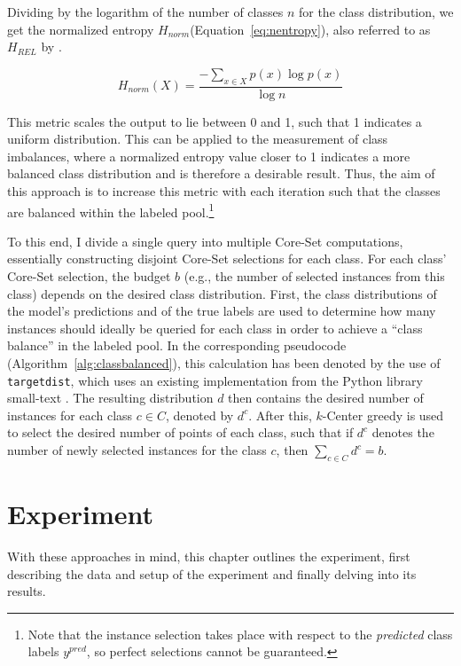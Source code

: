 \documentclass[english,bachelor,ul]{webisthesis} %
\begin{document}
\noindent Dividing by the logarithm of the number of classes $n$ for the class distribution, we get the normalized entropy $ H_{norm} $(Equation~\ref{eq:nentropy}), also referred to as $ H_{REL} $ by \cite{wilcox1967indices}.

\begin{equation}\label{eq:nentropy}
    H_{norm}(X) = \frac{-\sum_{x \in X} p(x) \log p(x)}{\log n}
\end{equation}

\noindent This metric scales the output to lie between 0 and 1, such that 1 indicates a uniform distribution. This can be applied to the measurement of class imbalances, where a normalized entropy value closer to 1 indicates a more balanced class distribution and is therefore a desirable result. Thus, the aim of this approach is to increase this metric with each iteration such that the classes are balanced within the labeled pool.\footnote{Note that the instance selection takes place with respect to the \textit{predicted} class labels $ y^{pred} $, so perfect selections cannot be guaranteed.}

To this end, I divide a single query into multiple Core-Set computations, essentially constructing disjoint Core-Set selections for each class. For each class' Core-Set selection, the budget $ b $ (e.g., the number of selected instances from this class) depends on the desired class distribution. First, the class distributions of the model's predictions and of the true labels are used to determine how many instances should ideally be queried for each class in order to achieve a ``class balance'' in the labeled pool. In the corresponding pseudocode (Algorithm~\ref{alg:classbalanced}), this calculation has been denoted by the use of \texttt{target\textunderscore dist}, which uses an existing implementation from the Python library small-text \citep{schroeder2023small-text}. The resulting distribution $ d $ then contains the desired number of instances for each class $ c \in C $, denoted by $ d^c $. After this, $k$-Center greedy is used to select the desired number of points of each class, such that if $ d^c $ denotes the number of newly selected instances for the class $ c $, then $ \sum_{c \in C} d^c = b $. 

\chapter{Experiment}

With these approaches in mind, this chapter outlines the experiment, first describing the data and setup of the experiment and finally delving into its results. 
\end{document}
